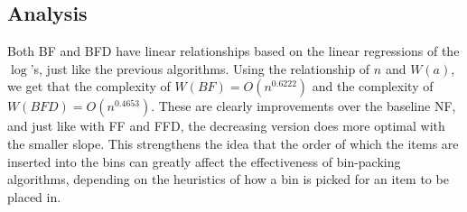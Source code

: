 \documentclass{article}
\begin{document}
\subsection{Analysis}
    Both BF and BFD have linear relationships based on the linear regressions of
    the $\log$'s, just like the previous algorithms. Using the relationship of
    $n$ and $W(a)$, we get that the complexity of 
    $W(BF) = O\left( n^{0.6222} \right)$ and the complexity of
    $W(BFD) = O\left( n^{0.4653} \right)$. These are clearly improvements over
    the baseline NF, and just like with FF and FFD, the decreasing version does 
    more optimal with the smaller slope. This strengthens the idea that the
    order of which the items are inserted into the bins can greatly affect the
    effectiveness of bin-packing algorithms, depending on the heuristics of how
    a bin is picked for an item to be placed in.
\end{document}

